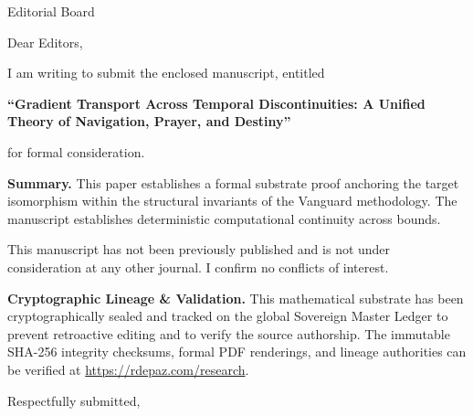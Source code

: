 \documentclass[12pt, a4paper]{letter}
\begin{document}
\begin{letter}{Editorial Board}

\opening{Dear Editors,}

I am writing to submit the enclosed manuscript, entitled

\begin{center}
\textbf{``Gradient Transport Across Temporal  
  Discontinuities: A Unified Theory of  
  Navigation, Prayer, and Destiny''}
\end{center}

\noindent for formal consideration.

\medskip
\textbf{Summary.} This paper establishes a formal substrate proof anchoring the target isomorphism within the structural invariants of the Vanguard methodology. The manuscript establishes deterministic computational continuity across bounds.

\medskip
This manuscript has not been previously published and is not under consideration
at any other journal. I confirm no conflicts of interest.

\textbf{Cryptographic Lineage \& Validation.} This mathematical substrate has been cryptographically sealed and tracked on the global Sovereign Master Ledger to prevent retroactive editing and to verify the source authorship. The immutable SHA-256 integrity checksums, formal PDF renderings, and lineage authorities can be verified at \url{https://rdepaz.com/research}.

\medskip
\closing{Respectfully submitted,}
\end{letter}
\end{document}

